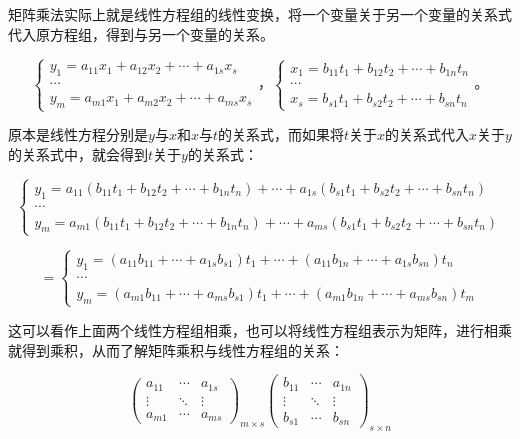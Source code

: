 \documentclass[UTF8, 12pt]{ctexart}
\begin{document}
矩阵乘法实际上就是线性方程组的线性变换，将一个变量关于另一个变量的关系式代入原方程组，得到与另一个变量的关系。

$$\begin{cases}
    y_1=a_{11}x_1+a_{12}x_2+\cdots+a_{1s}x_s \\
    \cdots \\
    y_m=a_{m1}x_1+a_{m2}x_2+\cdots+a_{ms}x_s
\end{cases}\text{，}\begin{cases}
    x_1=b_{11}t_1+b_{12}t_2+\cdots+b_{1n}t_n \\
    \cdots \\
    x_s=b_{s1}t_1+b_{s2}t_2+\cdots+b_{sn}t_n
\end{cases}\text{。}$$

原本是线性方程分别是$y$与$x$和$x$与$t$的关系式，而如果将$t$关于$x$的关系式代入$x$关于$y$的关系式中，就会得到$t$关于$y$的关系式：

$$\begin{cases}
    y_1=a_{11}(b_{11}t_1+b_{12}t_2+\cdots+b_{1n}t_n)+\cdots+a_{1s}(b_{s1}t_1+b_{s2}t_2+\cdots+b_{sn}t_n) \\
    \cdots \\
    y_m=a_{m1}(b_{11}t_1+b_{12}t_2+\cdots+b_{1n}t_n)+\cdots+a_{ms}(b_{s1}t_1+b_{s2}t_2+\cdots+b_{sn}t_n)
\end{cases}$$

$$=\begin{cases}
    y_1=(a_{11}b_{11}+\cdots+a_{1s}b_{s1})t_1+\cdots+(a_{11}b_{1n}+\cdots+a_{1s}b_{sn})t_n \\
    \cdots \\
    y_m=(a_{m1}b_{11}+\cdots+a_{ms}b_{s1})t_1+\cdots+(a_{m1}b_{1n}+\cdots+a_{ms}b_{sn})t_m
\end{cases}$$

这可以看作上面两个线性方程组相乘，也可以将线性方程组表示为矩阵，进行相乘就得到乘积，从而了解矩阵乘积与线性方程组的关系：


$$\left(\begin{array}{ccc}
    a_{11} & \cdots & a_{1s} \\
    \vdots & \ddots & \vdots \\
    a_{m1} & \cdots & a_{ms}
\end{array}\right)_{m\times s}\left(\begin{array}{ccc}
    b_{11} & \cdots & a_{1n} \\
    \vdots & \ddots & \vdots \\
    b_{s1} & \cdots & b_{sn}
\end{array}\right)_{s\times n}$$
\end{document}
